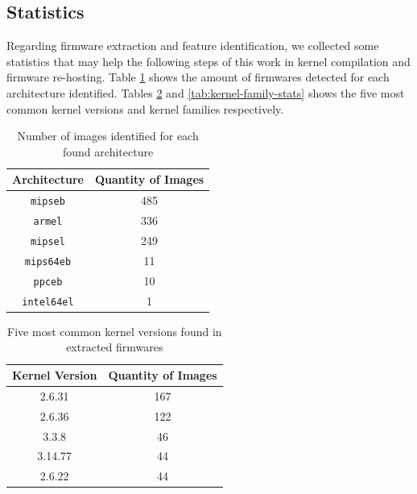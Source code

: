 
\subsection{Statistics}

Regarding firmware extraction and feature identification, we collected some statistics that may help the following steps of this work in kernel compilation and firmware re-hosting. Table \ref{tab:arch-stats} shows the amount of firmwares detected for each architecture identified. Tables \ref{tab:kernel-stats} and \ref{tab:kernel-family-stats} shows the five most common kernel versions and kernel families respectively.

\begin{table}[h]
\centering
\caption{Number of images identified for each found architecture}
\begin{tabular}{|c|c|}
\hline
\textbf{Architecture} & \textbf{Quantity of Images} \\ \hline
{\tt mipseb}                & 485                         \\ \hline
{\tt armel}                 & 336                         \\ \hline
{\tt mipsel}                & 249                         \\ \hline
{\tt mips64eb}              & 11                          \\ \hline
{\tt ppceb}                 & 10                          \\ \hline
{\tt intel64el}             & 1                           \\ \hline
\end{tabular}
\label{tab:arch-stats}
\end{table}

\begin{table}[h]
\centering
\caption{Five most common kernel versions found in extracted firmwares}
\begin{tabular}{|c|c|}
\hline
\textbf{Kernel Version} & \textbf{Quantity of Images} \\ \hline
2.6.31                  & 167               \\ \hline
2.6.36                  & 122               \\ \hline
3.3.8                   & 46                \\ \hline
3.14.77                 & 44                \\ \hline
2.6.22                  & 44                \\ \hline
\end{tabular}
\label{tab:kernel-stats}
\end{table}


